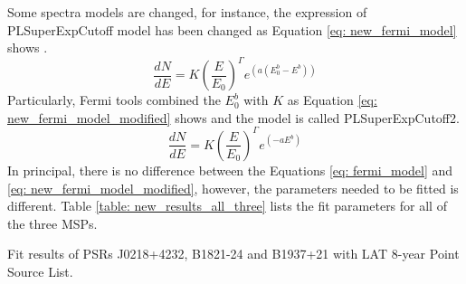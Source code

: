 \documentclass[12pt]{report}
\newcommand{\mycaption}[1]{\protect \caption{#1}}
\begin{document}
      Some spectra models are changed, for instance, the expression of PLSuperExpCutoff model has 
      been changed as Equation \ref{eq: new_fermi_model} shows \cite{newFermiModel}. 
      \begin{equation}
        \frac{dN}{dE} = K\left(\frac{E}{E_0}\right)^{\Gamma} e^{\left(a\left(E_0^b-E^b\right)\right)} 
        \label{eq: new_fermi_model}
      \end{equation}
      Particularly, Fermi tools combined the $E_0^b$ with $K$ as Equation 
      \ref{eq: new_fermi_model_modified} shows and the model is called PLSuperExpCutoff2. 
      \begin{equation}
        \frac{dN}{dE} = K\left(\frac{E}{E_0}\right)^{\Gamma} e^{\left(-aE^b\right)} 
        \label{eq: new_fermi_model_modified}
      \end{equation}
      In principal, there is no difference between the Equations \ref{eq: fermi_model} and 
      \ref{eq: new_fermi_model_modified}, however, the parameters needed to be fitted is different. 
      Table \ref{table: new_results_all_three} lists the fit parameters for all of the three MSPs.
      \begin{table}[!htp]
        \centering
          \mycaption{Fit results of PSRs J0218+4232, B1821-24 and B1937+21 with 
            LAT 8-year Point Source List.}
          \label{table: new_results_all_three}        
      \end{table}  
\end{document}
